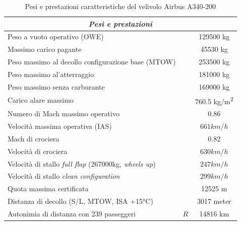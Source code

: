 \begin{table} [!h]\centering {}
	\begin{tabular}{l c c}
		\toprule
		\multicolumn{3}{c}{\emph{Pesi e prestazioni}} \\ 
		\midrule
		Peso a vuoto operativo (OWE) & \WOE & 129500 \si{kg} \\
		Massimo carico pagante & \WPLmax & 45530 \si{kg} \\
		Peso massimo al decollo configurazione base (MTOW)   &\MTOW & 253500 \si{kg} \\
		Peso massimo al'atterraggio    &\WLmax & 181000 \si{kg} \\
		Peso massimo senza carburante    &\Wzfmax & 169000 \si{kg} \\
		Carico alare massimo   &\WoverSmax & 760.5 \si{kg/m^2} \\
		\midrule		
		Numero di Mach massimo operativo & \Mmo & 0.86 \\
		Velocità massima operativa (IAS)  & \Vmo 	&  	$661 \si{km/h} $ 	\\
		Mach di crociera & \Mc &  	$0.82 $ 	\\
		Velocità di crociera & \Vc &  	$630 \si{km/h}$ 	\\
		Velocità di stallo {\itshape full flap} (267000kg, \emph{wheels up})	 & \Vsf 	&  	$247 \si{km/h} $  	\\
		Velocità di stallo {\itshape clean configuration}   & \Vsc&  $299 \si{km/h} $	\\
    	Quota massima certificata & \hmax & 12525 \si{m}\\
		Distanza di decollo	(S/L, MTOW, ISA +15°C) &	\TOFL & 3017 \si{meter}  \\
		Autonimia di distanza con 239 passeggeri &	$R$ & 14816 \si{km}  \\
		\bottomrule
\end{tabular}
	\caption {\footnotesize Pesi e prestazioni caratteristiche del velivolo Airbus A340-200}
	\label{tabV2}
\end{table}

